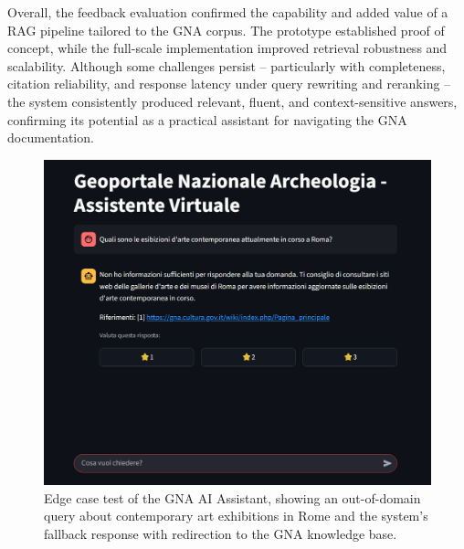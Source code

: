 \begin{spacing}{1.5}
\noindent Overall, the feedback evaluation confirmed the capability and added value of a RAG pipeline tailored to the GNA corpus. The prototype established proof of concept, while the full-scale implementation improved retrieval robustness and scalability. Although some challenges persist -- particularly with completeness, citation reliability, and response latency under query rewriting and reranking -- the system consistently produced relevant, fluent, and context-sensitive answers, confirming its potential as a practical assistant for navigating the GNA documentation.

\vspace{0.5em}
\begin{figure}[H]
  \centering
  \includegraphics[width=\textwidth]{images/edge_case_response.png} 
  \caption{Edge case test of the GNA AI Assistant, showing an out-of-domain query about contemporary art exhibitions in Rome and the system’s fallback response with redirection to the GNA knowledge base.}
  \label{fig:edge-case}
\end{figure}


\end{spacing}
